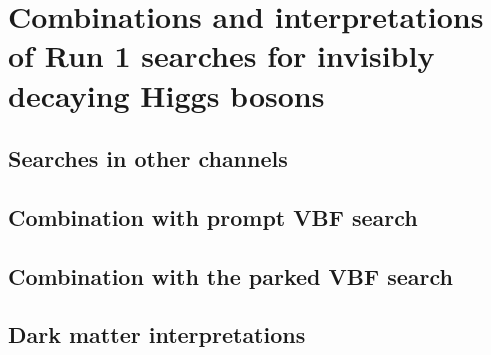 \chapter{Combinations and interpretations of Run 1 searches for invisibly decaying Higgs bosons}
\label{chap:comb}


\section{Searches in other channels}

\section{Combination with prompt VBF search}

\section{Combination with the parked VBF search}

\section{Dark matter interpretations}
